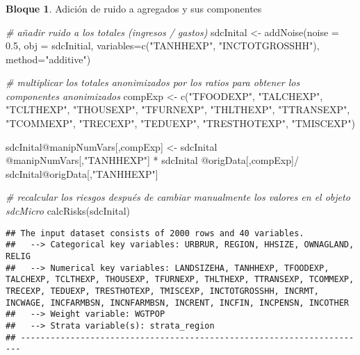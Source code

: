\documentclass[
]{book}
\newenvironment{Shaded}{\begin{snugshade}}{\end{snugshade}}
\newcommand{\AttributeTok}[1]{\textcolor[rgb]{0.77,0.63,0.00}{#1}}
\newcommand{\CommentTok}[1]{\textcolor[rgb]{0.56,0.35,0.01}{\textit{#1}}}
\newcommand{\FloatTok}[1]{\textcolor[rgb]{0.00,0.00,0.81}{#1}}
\newcommand{\FunctionTok}[1]{\textcolor[rgb]{0.00,0.00,0.00}{#1}}
\newcommand{\NormalTok}[1]{#1}
\newcommand{\OtherTok}[1]{\textcolor[rgb]{0.56,0.35,0.01}{#1}}
\newcommand{\SpecialCharTok}[1]{\textcolor[rgb]{0.00,0.00,0.00}{#1}}
\newcommand{\StringTok}[1]{\textcolor[rgb]{0.31,0.60,0.02}{#1}}
\theoremstyle{definition}
\theoremstyle{definition}
\newtheorem{example}{Bloque}[chapter]
\theoremstyle{definition}
\theoremstyle{definition}
\theoremstyle{remark}
\begin{document}
\hypertarget{section-10}{%
\subsubsection{}\label{section-10}}

\begin{example}
\protect\hypertarget{exm:bloque36jgm}{}\label{exm:bloque36jgm}Adición de ruido a agregados y sus componentes
\end{example}

\begin{Shaded}
\begin{Highlighting}[]
\CommentTok{\# añadir ruido a los totales (ingresos / gastos)}
\NormalTok{sdcInital }\OtherTok{\textless{}{-}} \FunctionTok{addNoise}\NormalTok{(}\AttributeTok{noise =} \FloatTok{0.5}\NormalTok{, }\AttributeTok{obj =}\NormalTok{ sdcInitial, }\AttributeTok{variables=}\FunctionTok{c}\NormalTok{(}\StringTok{"TANHHEXP"}\NormalTok{, }\StringTok{"INCTOTGROSSHH"}\NormalTok{), }\AttributeTok{method=}\StringTok{"additive"}\NormalTok{) }

\CommentTok{\# multiplicar los totales anonimizados por los ratios para obtener los componentes anonimizados}
\NormalTok{compExp }\OtherTok{\textless{}{-}}  \FunctionTok{c}\NormalTok{(}\StringTok{"TFOODEXP"}\NormalTok{, }\StringTok{"TALCHEXP"}\NormalTok{, }\StringTok{"TCLTHEXP"}\NormalTok{, }\StringTok{"THOUSEXP"}\NormalTok{, }
              \StringTok{"TFURNEXP"}\NormalTok{, }\StringTok{"THLTHEXP"}\NormalTok{, }\StringTok{"TTRANSEXP"}\NormalTok{, }\StringTok{"TCOMMEXP"}\NormalTok{, }
              \StringTok{"TRECEXP"}\NormalTok{, }\StringTok{"TEDUEXP"}\NormalTok{, }\StringTok{"TRESTHOTEXP"}\NormalTok{, }\StringTok{"TMISCEXP"}\NormalTok{)}

\NormalTok{sdcInital}\SpecialCharTok{@}\NormalTok{manipNumVars[,compExp] }\OtherTok{\textless{}{-}}\NormalTok{ sdcInital }\SpecialCharTok{@}\NormalTok{manipNumVars[,}\StringTok{"TANHHEXP"}\NormalTok{] }\SpecialCharTok{*} 
\NormalTok{                                      sdcInital }\SpecialCharTok{@}\NormalTok{origData[,compExp]}\SpecialCharTok{/}\NormalTok{ sdcInital}\SpecialCharTok{@}\NormalTok{origData[,}\StringTok{"TANHHEXP"}\NormalTok{]}

\CommentTok{\# recalcular los riesgos después de cambiar manualmente los valores en el objeto sdcMicro}
\FunctionTok{calcRisks}\NormalTok{(sdcInital)}
\end{Highlighting}
\end{Shaded}

\begin{verbatim}
## The input dataset consists of 2000 rows and 40 variables.
##   --> Categorical key variables: URBRUR, REGION, HHSIZE, OWNAGLAND, RELIG
##   --> Numerical key variables: LANDSIZEHA, TANHHEXP, TFOODEXP, TALCHEXP, TCLTHEXP, THOUSEXP, TFURNEXP, THLTHEXP, TTRANSEXP, TCOMMEXP, TRECEXP, TEDUEXP, TRESTHOTEXP, TMISCEXP, INCTOTGROSSHH, INCRMT, INCWAGE, INCFARMBSN, INCNFARMBSN, INCRENT, INCFIN, INCPENSN, INCOTHER
##   --> Weight variable: WGTPOP
##   --> Strata variable(s): strata_region
## ----------------------------------------------------------------------
\end{verbatim}
\end{document}
